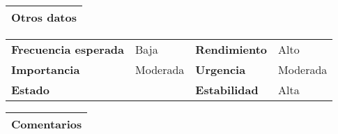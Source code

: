 \documentclass[11pt,a4paper]{article}
\begin{document}
\begin{table}[H]
	\begin{tabularx}{\textwidth}{X}
		\textbf{Otros datos}\\ \hline
	\end{tabularx}
	\begin{tabularx}{\textwidth}{lXlX}
		\textbf{Frecuencia esperada} & Baja & \textbf{Rendimiento} & Alto \\
		\textbf{Importancia} & Moderada & \textbf{Urgencia} & Moderada\\
                \textbf{Estado} & & \textbf{Estabilidad} & Alta \\
	\end{tabularx}
	
	\begin{tabularx}{\textwidth}{X}
		\textbf{Comentarios}\\ \hline
	\end{tabularx}
\end{table}


\end{document}
